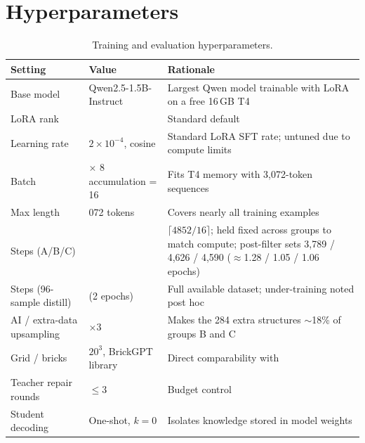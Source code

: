 \documentclass{article}
\begin{document}
\section{Hyperparameters}
\label{app:hparams}
\begin{table}[h]
\centering\small
\caption{Training and evaluation hyperparameters.}
\label{tab:hparams}
\begin{tabularx}{\linewidth}{@{}>{\raggedright\arraybackslash}p{3.1cm}>{\raggedright\arraybackslash}p{3.3cm}>{\raggedright\arraybackslash}X@{}}
\toprule
Setting & Value & Rationale \\
\midrule
Base model & Qwen2.5-1.5B-Instruct & Largest Qwen model trainable with LoRA on a free 16\,GB T4 \\
LoRA rank & 16 & Standard default \cite{hu2022lora} \\
Learning rate & $2\times10^{-4}$, cosine & Standard LoRA SFT rate; untuned due to compute limits \\
Batch & 2 $\times$ 8 accumulation = 16 & Fits T4 memory with 3{,}072-token sequences \\
Max length & 3{,}072 tokens & Covers nearly all training examples \\
Steps (A/B/C) & 304 & $\lceil 4852/16\rceil$; held fixed across groups to match compute; post-filter sets 3{,}789 / 4{,}626 / 4{,}590 ($\approx$1.28 / 1.05 / 1.06 epochs) \\
Steps (96-sample distill) & 12 (2 epochs) & Full available dataset; under-training noted post hoc \\
AI / extra-data upsampling & $\times3$ & Makes the 284 extra structures $\sim$18\% of groups B and C \\
Grid / bricks & $20^3$, BrickGPT library & Direct comparability with \cite{pun2025brickgpt} \\
Teacher repair rounds & $\le 3$ & Budget control \\
Student decoding & One-shot, $k{=}0$ & Isolates knowledge stored in model weights \\
\bottomrule
\end{tabularx}
\end{table}
\end{document}
